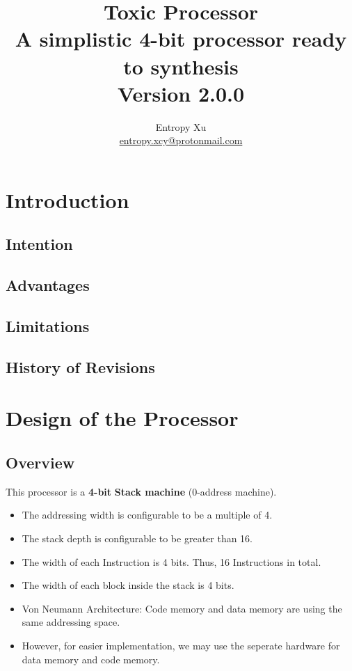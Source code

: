 \documentclass[11pt]{report}
\begin{document}
\begin{titlepage}
    \thispagestyle{empty}
    \title{%
    Toxic Processor \\
    \large A simplistic 4-bit processor ready to synthesis \\ 
    Version 2.0.0}
    \author{Entropy Xu \\ 
            \href{mailto:entropy.xcy@protonmail.com}{entropy.xcy@protonmail.com} }
    \maketitle
    \end{titlepage}
    \tableofcontents


    \chapter{Introduction}
    \section{Intention}
    \section{Advantages}
    \section{Limitations}
    \section{History of Revisions}


    \chapter{Design of the Processor}
    \label{chapter:design}
    \section{Overview}
    This processor is a \textbf{4-bit} \textbf{Stack machine} (0-address machine).
    \begin{itemize}
        \item The addressing width is configurable to be a multiple of 4.
        \item The stack depth is configurable to be greater than 16.
        \item The width of each Instruction is 4 bits. Thus, 16 Instructions in total.
        \item The width of each block inside the stack is 4 bits.
        \item Von Neumann Architecture: Code memory and data memory are using the same addressing space.
        \item However, for easier implementation, we may use the seperate hardware for data memory and code memory.
    \end{itemize}
\end{document}
